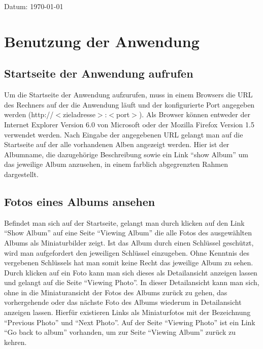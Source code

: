 \documentclass[a4paper,12pt,liststotocnumbered]{scrartcl}
\begin{document}
\begin{center}
	Datum: \today\\
\end{center}

\newpage

\pagestyle{scrheadings}

\tableofcontents

\newpage

\section{Benutzung der Anwendung}

\subsection{Startseite der Anwendung aufrufen}

Um die Startseite der Anwendung aufzurufen, muss in einem Browsers die
URL des Rechners auf der die Anwendung läuft und der konfigurierte Port
angegeben werden (http://$<$zieladresse$>$:$<$port$>$). Als Browser
können entweder der Internet Explorer Version 6.0 von Microsoft oder der
Mozilla Firefox Version 1.5 verwendet werden.  Nach Eingabe der
angegebenen URL gelangt man auf die Startseite auf der alle vorhandenen
Alben angezeigt werden. Hier ist der Albumname, die dazugehörige
Beschreibung sowie ein Link "`show Album"' um das jeweilige Album
anzusehen, in einem farblich abgegrenzten Rahmen dargestellt.

\subsection{Fotos eines Albums ansehen}

Befindet man sich auf der Startseite, gelangt man durch klicken auf den
Link "`Show Album"' auf eine Seite "`Viewing Album"' die alle Fotos des
ausgewählten Albums als Miniaturbilder zeigt. Ist das Album durch einen
Schlüssel geschützt, wird man aufgefordert den jeweiligen Schlüssel
einzugeben. Ohne Kenntnis des vergebenen Schlüssels hat man somit keine
Recht das jeweilige Album zu sehen. Durch klicken auf ein Foto kann man
sich dieses als Detailansicht anzeigen lassen und gelangt auf die Seite
"`Viewing Photo"'. In dieser Detailansicht kann man sich, ohne in die
Miniaturansicht der Fotos des Albums zurück zu gehen, das vorhergehende
oder das nächste Foto des Albums wiederum in Detailansicht anzeigen
lassen. Hierfür existieren Links als Miniaturfotos mit der Bezeichnung
"`Previous Photo"' und "`Next Photo"'. Auf der Seite "`Viewing Photo"'
ist ein Link "`Go back to album"' vorhanden, um zur Seite "`Viewing
Album"' zurück zu kehren.
\end{document}
